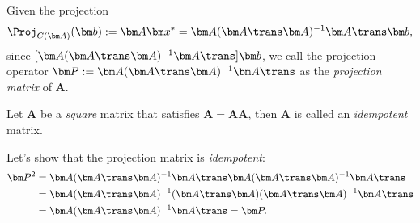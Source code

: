 \begin{definition}
Given the projection
\[
\Proj_{C(\bm A)}(\bm b):=\bm A\bm x^{*}=\bm A(\bm A\trans\bm A)^{-1}\bm A\trans\bm b,
\]
since $[\bm A(\bm A\trans\bm A)^{-1}\bm A\trans]\bm b$,
we call the projection operator $\bm P:=\bm A(\bm A\trans\bm A)^{-1}\bm A\trans$ as the \emph{projection matrix} of $\bm A$.
\end{definition}
\begin{definition}[Idempotent]
Let $\bm A$ be a \emph{square} matrix that satisfies $\bm A=\bm A\bm A$, then $\bm A$ is called an \emph{idempotent} matrix.
\end{definition}
Let's show that the projection matrix is \textit{idempotent}:
\[
\begin{aligned}
\bm P^{2}&=\bm A(\bm A\trans\bm A)^{-1}\bm A\trans\bm A(\bm A\trans\bm A)^{-1}\bm A\trans\\
&=\bm A(\bm A\trans\bm A)^{-1}(\bm A\trans\bm A)(\bm A\trans\bm A)^{-1}\bm A\trans\\
&=\bm A(\bm A\trans\bm A)^{-1}\bm A\trans=\bm P.
\end{aligned}
\]

